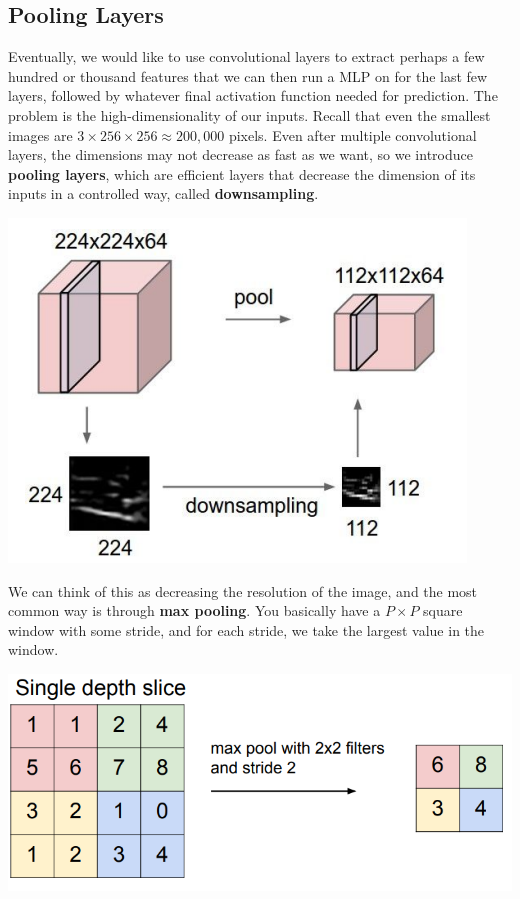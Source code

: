 \documentclass{article}
\theoremstyle{definition}
\theoremstyle{remark}
\theoremstyle{definition}
\begin{document}
\subsection{Pooling Layers}

Eventually, we would like to use convolutional layers to extract perhaps a few hundred or thousand features that we can then run a MLP on for the last few layers, followed by whatever final activation function needed for prediction. The problem is the high-dimensionality of our inputs. Recall that even the smallest images are $3 \times 256 \times 256 \approx 200,000$ pixels. Even after multiple convolutional layers, the dimensions may not decrease as fast as we want, so we introduce \textbf{pooling layers}, which are efficient layers that decrease the dimension of its inputs in a controlled way, called \textbf{downsampling}. 
\begin{center}
    \includegraphics[scale=0.3]{Images/CNNs/max_pool1.png}
\end{center}
We can think of this as decreasing the resolution of the image, and the most common way is through \textbf{max pooling}. You basically have a $P \times P$ square window with some stride, and for each stride, we take the largest value in the window. 
\begin{center}
    \includegraphics[scale=0.3]{Images/CNNs/max_pool2.png}
\end{center}
\end{document}
